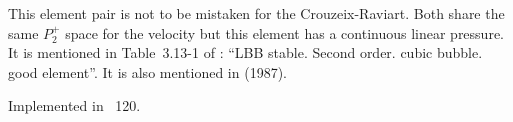 
This element pair is not to be mistaken for the Crouzeix-Raviart. Both share the same $P_2^+$ space
for the velocity but this element has a continuous linear pressure.  
It is mentioned in Table~3.13-1 of \textcite{grsa}: ``LBB stable. Second order. cubic bubble. good element''.
It is also mentioned in \textcite{sofo87} (1987).

Implemented in \stone~120.
